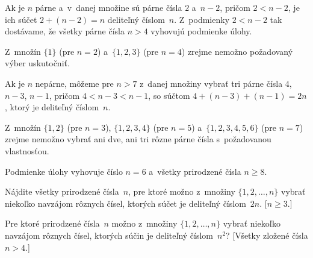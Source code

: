 {%
Ak je $n$ párne a~v~danej množine sú párne čísla $2$ a~$n-2$,
pričom $2<n-2$, je ich súčet $2+(n-2)=n$ deliteľný
číslom~$n$. Z~podmienky $2<n-2$ tak dostávame, že všetky párne čísla
$n>4$ vyhovujú podmienke úlohy.

Z~množín $\{1\}$ (pre $n=2$) a~$\{1,2,3\}$ (pre $n=4$) zrejme
nemožno požadovaný výber uskutočniť.

Ak je $n$ nepárne, môžeme pre $n>7$ z~danej množiny
vybrať tri párne čísla $4$, $n-3$, $n-1$, pričom $4<n-3<n-1$,
so súčtom $4+(n-3)+(n-1)=2n$, ktorý je deliteľný číslom~$n$.

Z~množín $\{1,2\}$ (pre $n=3$), $\{1,2,3,4\}$ (pre $n=5$) 
a~$\{1,2,3,4,5,6\}$ (pre $n=7$) zrejme nemožno vybrať ani dve, ani
tri rôzne párne čísla s~požadovanou vlastnosťou.

Podmienke úlohy vyhovuje číslo $n=6$ a~všetky prirodzené čísla
$n\ge8$.



Nájdite všetky prirodzené čísla~$n$, pre ktoré možno z~množiny
$\{1,2,\dots,n\}$ vybrať niekoľko navzájom rôznych čísel, ktorých
súčet je deliteľný číslom~$2n$. [$n\ge3$.]

Pre ktoré prirodzené čísla~$n$ možno z~množiny $\{1,2,\dots,n\}$
vybrať niekoľko navzájom rôznych čísel, ktorých súčin je
deliteľný číslom~$n^2$? [Všetky zložené čísla $n>4$.]
}

